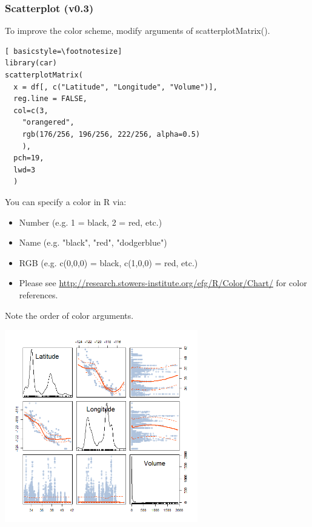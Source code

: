 \begin{frame}
\frametitle{Scatterplot (v0.3)}

To improve the color scheme, modify arguments of \ttfamily scatterplotMatrix().  
  		\begin{lstlisting}[ basicstyle=\footnotesize]
library(car)		
scatterplotMatrix(
  x = df[, c("Latitude", "Longitude", "Volume")], 
  reg.line = FALSE,
  col=c(3,
    "orangered",
    rgb(176/256, 196/256, 222/256, alpha=0.5)
    ), 
  pch=19,
  lwd=3
  )
		\end{lstlisting}
\normalfont
\framebreak
You can specify a color in R via: 
\begin{itemize}
	\item Number (e.g. 1 = black, 2 = red, etc.)
	\item Name (e.g. "black", "red", "dodgerblue")
	\item RGB (e.g. c(0,0,0) = black, c(1,0,0) = red, etc.)
	\item Please see \url{http://research.stowers-institute.org/efg/R/Color/Chart/} for color references. 
\end{itemize}

\noindent Note the order of color arguments. \normalfont
        \begin{center}
         \includegraphics[width=0.63\textwidth]{images/scatterPlot_v3.png}
        \end{center}
\end{frame}



